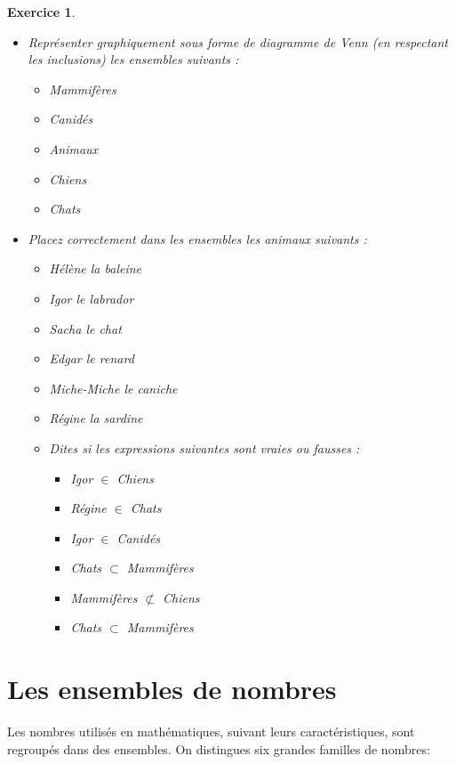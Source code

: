 \documentclass[10pt,a4paper,oneside]{book}
\newtheorem{exo}{Exercice}
\begin{document}
\begin{exo}
    \begin{itemize}
        \item Représenter graphiquement sous forme de diagramme de Venn (en respectant les inclusions) les ensembles suivants :
        \begin{itemize}
            \item Mammifères
            \item Canidés
            \item Animaux
            \item Chiens
            \item Chats
        \end{itemize}
    \item Placez correctement dans les ensembles les animaux suivants :
        \begin{itemize}
            \item Hélène la baleine
            \item Igor le labrador
            \item Sacha le chat
            \item Edgar le renard
            \item Miche-Miche le caniche
            \item Régine la sardine
    \item Dites si les expressions suivantes sont vraies ou fausses :
        \begin{itemize}
            \item Igor $\in$ Chiens
            \item Régine $\in$ Chats
            \item Igor $\in$ Canidés
            \item Chats $\subset$ Mammifères
            \item Mammifères $\not\subset$ Chiens
            \item Chats $\subset$ Mammifères
        \end{itemize} 
        \end{itemize}    
    \end{itemize}
\end{exo}



\section{Les ensembles de nombres}
Les nombres utilisés en mathématiques, suivant leurs caractéristiques, sont regroupés 
dans des ensembles. On distingues six grandes familles de nombres:
\end{document}
